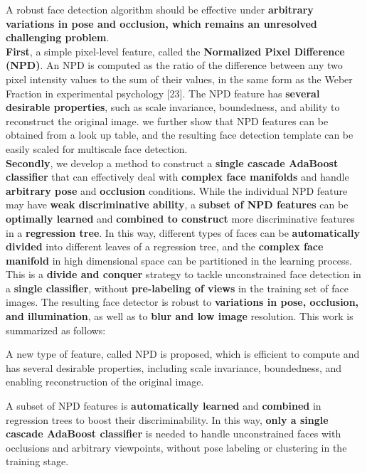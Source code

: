 \documentclass[a4paper,12pt]{article}
\begin{document}
A robust face detection algorithm should be effective under \textbf{arbitrary variations in pose and occlusion, 
which remains an unresolved challenging problem}. \\

\textbf{First}, a simple pixel-level feature, called the \textbf{Normalized Pixel Difference (NPD)}. 
An NPD is computed as the ratio of the difference between any two pixel intensity values to the sum of their values, in the
same form as the Weber Fraction in experimental psychology [23]. The NPD feature has \textbf{several desirable properties}, 
such as scale invariance, boundedness, and ability to reconstruct the original image. 
we further show that NPD features can be obtained from a look up table, and the resulting face detection template 
can be easily scaled for multiscale face detection. \\

\textbf{Secondly}, we develop a method to construct a \textbf{single cascade AdaBoost classifier} that can effectively deal  
with \textbf{complex face manifolds} and handle \textbf{arbitrary pose} and \textbf{occlusion} conditions. 
While the individual NPD feature may have \textbf{weak discriminative ability}, 
a \textbf{subset of NPD features} can be \textbf{optimally learned} and 
\textbf{combined to construct} more discriminative features in a \textbf{regression tree}. In this way, 
different types of faces can be \textbf{automatically divided} into different leaves of a regression tree, 
and the \textbf{complex face manifold} in high dimensional space can be partitioned in the learning process. \\

This is a \textbf{divide and conquer} strategy to tackle unconstrained face detection in a \textbf{single classifier}, 
without \textbf{pre-labeling of views} in the training set of face images. 
The resulting face detector is robust to \textbf{variations in pose, occlusion, and illumination}, 
as well as to \textbf{blur and low image} resolution. This work is summarized as follows:

\begin{compactitem}
\item A new type of feature, called NPD is proposed, which is efficient to compute and has several desirable properties, 
including scale invariance, boundedness, and enabling reconstruction of the original image.
\item A subset of NPD features is \textbf{automatically learned} and \textbf{combined} 
in regression trees to boost their discriminability. In this way, \textbf{only a single cascade AdaBoost classifier} 
is needed to handle unconstrained faces with occlusions and arbitrary viewpoints, 
without pose labeling or clustering in the training stage.\\
\end{compactitem}
\end{document}
